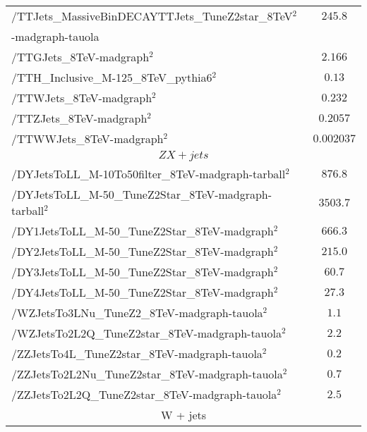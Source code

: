 \begin{table}[!ht]
\begin{center}
{\begin{tabular}{|l|c|}
/TTJets\_MassiveBinDECAYTTJets\_TuneZ2star\_8TeV$^{2}$  &  $245.8$       \\
-madgraph-tauola                                        &               \\
/TTGJets\_8TeV-madgraph$^{2}$                                  &  $2.166$              \\
/TTH\_Inclusive\_M-125\_8TeV\_pythia6$^{2}$                    &  $0.13$               \\
/TTWJets\_8TeV-madgraph$^{2}$                                  &  $0.232$              \\
/TTZJets\_8TeV-madgraph$^{2}$                                  &  $0.2057$                \\
/TTWWJets\_8TeV-madgraph$^{2}$                                 &  $0.002037$                \\

\hline
\multicolumn{2}{|c|}{$ZX+jets$ }\\
\hline
/DYJetsToLL\_M-10To50filter\_8TeV-madgraph-tarball$^{2}$      &   $876.8$               \\
/DYJetsToLL\_M-50\_TuneZ2Star\_8TeV-madgraph-tarball$^{2}$    &   $3503.7$               \\
/DY1JetsToLL\_M-50\_TuneZ2Star\_8TeV-madgraph$^{2}$           &   $666.3$               \\
/DY2JetsToLL\_M-50\_TuneZ2Star\_8TeV-madgraph$^{2}$           &   $215.0$               \\
/DY3JetsToLL\_M-50\_TuneZ2Star\_8TeV-madgraph$^{2}$           &   $60.7$               \\
/DY4JetsToLL\_M-50\_TuneZ2Star\_8TeV-madgraph$^{2}$           &   $27.3$               \\
/WZJetsTo3LNu\_TuneZ2\_8TeV-madgraph-tauola$^{2}$             &  $1.1$                \\
/WZJetsTo2L2Q\_TuneZ2star\_8TeV-madgraph-tauola$^{2}$         &  $2.2$                \\
/ZZJetsTo4L\_TuneZ2star\_8TeV-madgraph-tauola$^{2}$           &  $0.2$                \\
/ZZJetsTo2L2Nu\_TuneZ2star\_8TeV-madgraph-tauola$^{2}$        &  $0.7$                \\
/ZZJetsTo2L2Q\_TuneZ2star\_8TeV-madgraph-tauola$^{2}$         &  $2.5$                \\
\hline
\multicolumn{2}{|c|}{W + jets }\\
\hline


\end{tabular}}
\end{center}
\end{table}
